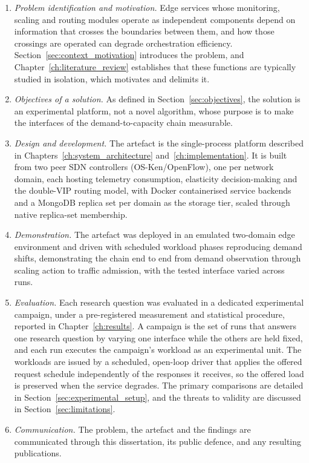 ﻿\documentclass[12pt,reqno,twoside]{amsbook}
\begin{document}
\begin{enumerate}
\item \textit{Problem identification and motivation.} Edge services whose
monitoring, scaling and routing modules operate as independent components
depend on information that crosses the boundaries between them, and how
those crossings are operated can degrade orchestration
efficiency. Section~\ref{sec:context_motivation} introduces the problem, and
Chapter~\ref{ch:literature_review} establishes that these functions are
typically studied in isolation, which motivates and delimits it.

\item \textit{Objectives of a solution.} As defined in Section~\ref{sec:objectives},
the solution is an experimental platform, not a novel algorithm, whose
purpose is to make the interfaces of the demand-to-capacity chain
measurable.

\item \textit{Design and development.} The artefact is the single-process platform
described in Chapters~\ref{ch:system_architecture} and~\ref{ch:implementation}.
It is built from two peer SDN controllers (OS-Ken/OpenFlow), one per network
domain, each hosting telemetry consumption, elasticity decision-making and the
double-VIP routing model, with Docker containerised service backends and a
MongoDB replica set per domain as the storage tier, scaled through native
replica-set membership.

\item \textit{Demonstration.} The artefact was deployed in an emulated
two-domain edge environment and driven with scheduled workload phases
reproducing demand shifts, demonstrating the chain end to end from demand
observation through scaling action to traffic admission, with the tested
interface varied across runs.

\item \textit{Evaluation.} Each research question was evaluated in a dedicated
experimental campaign, under a pre-registered measurement and statistical
procedure, reported in Chapter~\ref{ch:results}. A campaign is the set of runs
that answers one research question by varying one interface while the others
are held fixed, and each run executes the campaign's workload as an
experimental unit. The workloads are issued by a scheduled, open-loop driver
that applies the offered request schedule independently of the responses it
receives, so the offered load is preserved when the service degrades. The
primary comparisons are detailed in Section~\ref{sec:experimental_setup}, and
the threats to validity are discussed in Section~\ref{sec:limitations}.

\item \textit{Communication.} The problem, the artefact and the findings are
communicated through this dissertation, its public defence, and any resulting
publications.
\end{enumerate}
\end{document}
